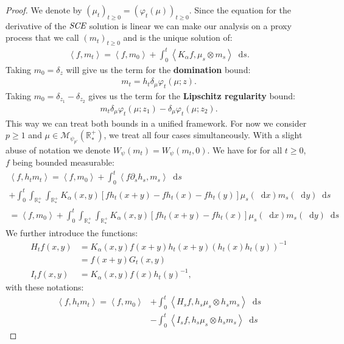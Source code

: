 \documentclass[11pt,a4paper]{article}
\newcommand{\RRP}{\mathbb{R}^+_*}
\newcommand{\MC}{\mathcal{M}}
\newcommand{\SCE}{\emph{SCE}}
\newcommand{\Proc}[1]{\left(#1\right)_{t\geq 0}}
\newcommand{\brac}[1]{\left\langle#1\right\rangle}
\newcommand{\dd}{\mathop{}\!\mathrm{d}}
\begin{document}
\begin{proof}
    We denote by $\Proc{\mu_t} = \Proc{\varphi_t(\mu)}$. Since the equation for the derivative of the $\SCE$  solution is linear we can make our analysis on a proxy process that we call $\Proc{m_t}$ and is the unique solution of:
    \begin{align*}
        \brac{f,m_t} = \brac{f,m_0} + \int_0^t \brac{K_\alpha f,\mu_s\otimes m_s} \dd s.
    \end{align*}
    Taking $m_0 = \delta_z$ will give us the term for the \textbf{domination} bound:
    \begin{align*}
        m_t = h_t\delta_\mu \varphi_t(\mu;z).
    \end{align*}
    Taking $m_0 = \delta_{z_1} - \delta_{z_2}$ gives us the term for the \textbf{Lipschitz regularity} bound: 
    \begin{align*}
        m_t \delta_\mu \varphi_t(\mu;z_1) - \delta_\mu \varphi_t(\mu;z_2).
    \end{align*}
    This way we can treat both bounds in a unified framework. For now we consider $p \geq 1$ and $\mu \in \MC_{\psi_{p'}}(\RRP)$, we treat all four cases simultaneously.
    With a slight abuse of notation we denote $W_{\psi}(m_t) = W_{\psi}(m_t,0)$. We have for for all $t\geq 0$, $f$ being bounded measurable:
    \begin{multline*}
        \brac{f,h_tm_t} = \brac{f,m_0} + \int_0^t \brac{f \partial_s h_s,m_s} \dd s \\
        + \int_0^t \int_{\RRP}\int_{\RRP}K_\alpha(x,y) \left[fh_t(x+y) - fh_t(x) - fh_t(y) \right] \mu_s(\dd x) m_s(\dd y) \dd s \\
        = \brac{f,m_0} + \int_0^t \int_{\RRP}\int_{\RRP}K_\alpha(x,y) \left[fh_t(x+y) - fh_t(x)\right] \mu_s(\dd x) m_s(\dd y) \dd s
    \end{multline*}
    We further introduce the functions:
    \begin{align*}
        H_tf(x,y) &= K_\alpha(x,y) f(x+y) h_t(x+y)\left(h_t(x)h_t(y)\right)^{-1} \\
        &= f(x+y) G_t(x,y)\\
        I_tf(x,y) &= K_\alpha(x,y)f(x) h_t(y)^{-1},
    \end{align*}
    with these notations:
    \begin{subequations}
    \begin{align}
        \brac{f,h_tm_t} = \brac{f,m_0} &+ \int_0^t \brac{H_sf,h_s\mu_s \otimes h_s m_s} \dd s\label{proof:eq:wass-rescaled-SCE-1}\\
        &-\int_0^t \brac{I_sf,h_s\mu_s \otimes h_s m_s} \dd s\label{proof:eq:wass-rescaled-SCE-2}
    \end{align}
    \label{proof:eq:wass-rescaled-SCE}
    \end{subequations}


\end{proof}
\end{document}
